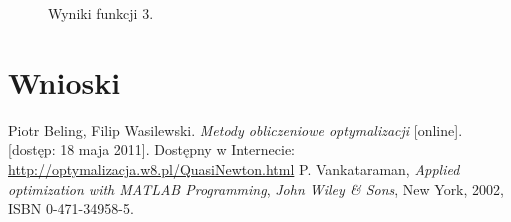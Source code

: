 \documentclass{classrep}
\begin{document}
\begin{figure}
\noindent{}
\caption{Wyniki funkcji 3.}
\end{figure}

\section{Wnioski}

\begin{thebibliography}{99}
Piotr Beling, Filip Wasilewski. \textit{Metody obliczeniowe optymalizacji} [online]. [dostęp: 18 maja 2011]. Dostępny w Internecie: \url{http://optymalizacja.w8.pl/QuasiNewton.html}
P. Vankataraman, \textit{Applied optimization with MATLAB Programming}, \textit{John Wiley \& Sons}, New York, 2002, ISBN 0-471-34958-5.
\end{thebibliography}
\end{document}
